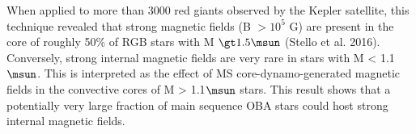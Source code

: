 When applied to more than 3000 red giants observed by the Kepler satellite, this technique revealed that
strong magnetic fields (B $\gt 10^5$ G) are present in the core of roughly 50\% of RGB stars with M $\gt 1.5\msun$ (Stello et al. 2016).
Conversely, strong internal magnetic fields are very rare in stars with M < 1.1$\msun$. This is interpreted as the
effect of MS core-dynamo-generated magnetic fields in the convective cores of M > 1.1$\msun$ stars.
This result shows that a potentially very large fraction of main sequence OBA stars could host strong internal magnetic fields.




